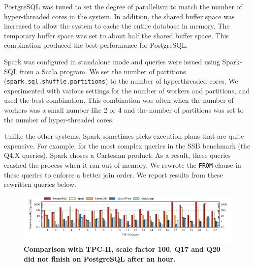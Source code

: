PostgreSQL was tuned to set the degree of parallelism to match the number of hyper-threaded cores in the system. In addition, the shared buffer space was increased to allow the system to cache the entire database in memory. The temporary buffer space was set to about half the shared buffer space. %
This combination produced the best performance for PostgreSQL. %

Spark was configured in standalone mode and queries were issued using Spark-SQL from a Scala program. %
We set the number of partitions (\texttt{spark.sql.shuffle.partitions}) to the number of hyperthreaded cores. We experimented with various settings for the number of workers and partitions, and used the best combination. This combination was often when the number of workers was a small number like 2 or 4 and the number of partitions was set to the number of hyper-threaded cores. %

Unlike the other systems, Spark sometimes picks execution plans that are quite expensive. For example, for the most complex queries in the SSB benchmark (the Q4.X queries), Spark choses a Cartesian product. As a result, these queries crashed the process when it ran out of memory. We rewrote the \texttt{FROM} clause in these queries to enforce a better join order. We report results from these rewritten queries below.

\begin{figure}
	\center
	\includegraphics[]{system/figures/all-tpch-sf100.pdf}
	\caption{\textbf{Comparison with TPC-H, scale factor 100. Q17 and Q20 did not finish on PostgreSQL after an hour.}} %
	\label{fig-tpch-sf100}
\end{figure}


